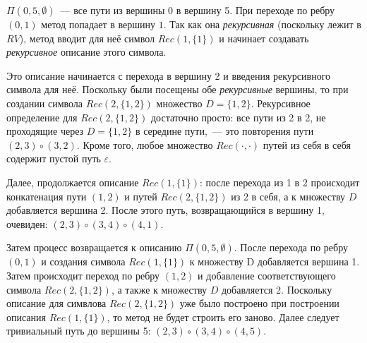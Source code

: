 $\Pi(0,5,\emptyset)$~--- все пути из вершины 0 в вершину 5.
При переходе по ребру $(0,1)$ метод попадает в вершину $1$. Так как она \emph{рекурсивная} (поскольку лежит в $RV$), метод вводит для неё символ $Rec(1,\{1\})$ и начинает создавать \emph{рекурсивное} описание этого символа.

Это описание начинается с перехода в вершину 2 и введения рекурсивного символа для неё. Поскольку были посещены обе \emph{рекурсивные} вершины, то при создании символа $Rec(2,\{1,2\})$ множество $D = \{1,2\}$.
Рекурсивное определение для $Rec(2,\{1,2\})$ достаточно просто: все пути из 2 в 2, не проходящие через $D = \{1,2\}$ в середине пути,~--- это повторения пути $(2,3) \circ (3,2)$.
Кроме того, любое множество $Rec(\cdot, \cdot)$ путей из себя в себя содержит пустой путь $\varepsilon$.

Далее, продолжается описание $Rec(1,\{1\})$: после перехода из 1 в 2 происходит конкатенация пути $(1,2)$ и путей $Rec(2,\{1,2\})$ из 2 в себя, а к множеству $D$ добавляется вершина 2.
После этого путь, возвращающийся в вершину 1, очевиден: $(2,3) \circ (3,4) \circ (4,1)$.

Затем процесс возвращается к описанию $\Pi(0,5,\emptyset)$. После перехода по ребру $(0,1)$ и создания символа $Rec(1,\{1\})$ к множеству D добавляется вершина 1.
Затем происходит переход по ребру $(1,2)$ и добавление соответствующего символа $Rec(2,\{1,2\})$, а также к множеству $D$ добавляется 2. 
Поскольку описание для симвлова $Rec(2,\{1,2\})$ уже было построено при построении описания $Rec(1,\{1\})$, то метод не будет строить его заново. 
Далее следует тривиальный путь до вершины 5: $(2,3) \circ (3,4) \circ (4,5)$.
\endgroup


